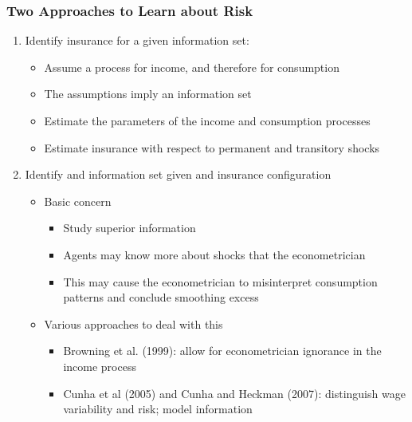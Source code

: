 \begin{frame}
		\frametitle{Two Approaches to Learn about Risk}
	\begin{enumerate}
		\item Identify insurance for a given information set:
			\begin{itemize}
				\item Assume a process for income, and therefore for consumption
				\item The assumptions imply an information set
				\item Estimate the parameters of the income and consumption processes
				\item Estimate insurance with respect to permanent and transitory shocks			
			\end{itemize}
		\item Identify and information set given and insurance configuration
			\begin{itemize}
				\item Basic concern
				\begin{itemize}
					\item Study superior information
					\item Agents may know more about shocks that the econometrician
					\item This may cause the econometrician to misinterpret consumption patterns and conclude smoothing excess
				\end{itemize}
					\item Various approaches to deal with this
						\begin{itemize}
					\item Browning et al. (1999): allow for econometrician ignorance in the income process
					\item Cunha et al (2005) and Cunha and Heckman (2007): distinguish wage variability and risk; model information
						\end{itemize}
			\end{itemize}
	\end{enumerate}
\end{frame}


